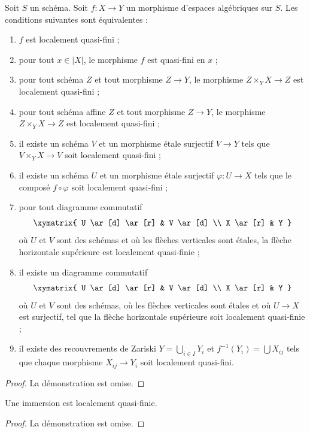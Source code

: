 \begin{lemma}
\label{lemma-quasi-finite-local}
Soit $S$ un schéma.
Soit $f : X \to Y$ un morphisme d'espaces algébriques sur $S$.
Les conditions suivantes sont équivalentes :
\begin{enumerate}
\item $f$ est localement quasi-fini ;
\item pour tout $x \in |X|$, le morphisme $f$ est quasi-fini en $x$ ;
\item pour tout schéma $Z$ et tout morphisme $Z \to Y$, le morphisme
$Z \times_Y X \to Z$ est localement quasi-fini ;
\item pour tout schéma affine $Z$ et tout morphisme
$Z \to Y$, le morphisme $Z \times_Y X \to Z$ est localement quasi-fini ;
\item il existe un schéma $V$ et un morphisme étale surjectif
$V \to Y$ tels que $V \times_Y X \to V$ soit localement quasi-fini ;
\item il existe un schéma $U$ et un morphisme étale surjectif
$\varphi : U \to X$ tels que le composé $f \circ \varphi$
soit localement quasi-fini ;
\item pour tout diagramme commutatif
$$
\xymatrix{
U \ar[d] \ar[r] & V \ar[d] \\
X \ar[r] & Y
}
$$
où $U$ et $V$ sont des schémas et où les flèches verticales sont étales,
la flèche horizontale supérieure est localement quasi-finie ;
\item il existe un diagramme commutatif
$$
\xymatrix{
U \ar[d] \ar[r] & V \ar[d] \\
X \ar[r] & Y
}
$$
où $U$ et $V$ sont des schémas, où les flèches verticales sont étales et où
$U \to X$ est surjectif, tel que la flèche horizontale supérieure soit
localement quasi-finie ;
\item il existe des recouvrements de Zariski $Y = \bigcup_{i \in I} Y_i$
et $f^{-1}(Y_i) = \bigcup X_{ij}$ tels que
chaque morphisme $X_{ij} \to Y_i$ soit localement quasi-fini.
\end{enumerate}
\end{lemma}

\begin{proof}
La démonstration est omise.
\end{proof}

\begin{lemma}
\label{lemma-immersion-quasi-finite}
Une immersion est localement quasi-finie.
\end{lemma}

\begin{proof}
La démonstration est omise.
\end{proof}

